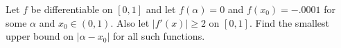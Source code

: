 Let $f$ be differentiable on $[0, 1]$ and let $f(\alpha) = 0$ and $f(x_0) =
-.0001$ for some $\alpha$ and $x_0 \in (0, 1)$. Also let $|f'(x)| \ge 2$ on
$[0, 1]$. Find the smallest upper bound on $|\alpha - x_0|$ for all such
functions.
